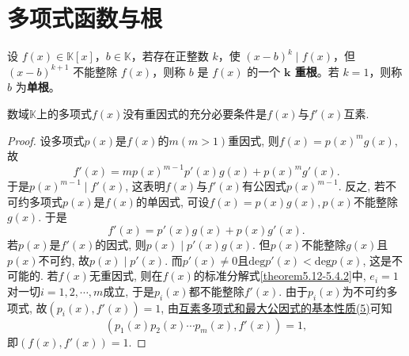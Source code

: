 \documentclass[../../main.tex]{subfiles}
\begin{document}
\section{多项式函数与根}

\begin{definition}[多项式的重根]\label{definition:多项式的重根}
设 $f(x) \in \mathbb{K}[x]$，$b \in \mathbb{K}$，若存在正整数 $k$，使 $(x - b)^k \mid f(x)$，但 $(x - b)^{k+1}$ 不能整除 $f(x)$，则称 $b$ 是 $f(x)$ 的一个 \textbf{$\boldsymbol{k}$ 重根}。若 $k = 1$，则称 $b$ 为\textbf{单根}。
\end{definition}

\begin{theorem}[多项式没有重因式的充要条件]\label{theorem:多项式没有重因式的充要条件}
数域\(\mathbb{K}\)上的多项式\(f(x)\)没有重因式的充分必要条件是\(f(x)\)与\(f'(x)\)互素.
\end{theorem}
\begin{proof}
设多项式\(p(x)\)是\(f(x)\)的\(m(m > 1)\)重因式, 则\(f(x)=p(x)^mg(x)\), 故
\[
f'(x)=mp(x)^{m - 1}p'(x)g(x)+p(x)^mg'(x).
\]
于是\(p(x)^{m - 1}\mid f'(x)\), 这表明\(f(x)\)与\(f'(x)\)有公因式\(p(x)^{m - 1}\).
反之, 若不可约多项式\(p(x)\)是\(f(x)\)的单因式, 可设\(f(x)=p(x)g(x), p(x)\)不能整除\(g(x)\). 于是
\[
f'(x)=p'(x)g(x)+p(x)g'(x).
\]
若\(p(x)\)是\(f'(x)\)的因式, 则\(p(x)\mid p'(x)g(x)\). 但\(p(x)\)不能整除\(g(x)\)且\(p(x)\)不可约, 故\(p(x)\mid p'(x)\). 而\(p'(x)\neq 0\)且\(\mathrm{deg }p'(x)<\mathrm{deg }p(x)\), 这是不可能的. 若\(f(x)\)无重因式, 则在\(f(x)\)的标准分解式\eqref{theorem5.12-5.4.2}中, \(e_i = 1\)对一切\(i = 1,2,\cdots,m\)成立, 于是\(p_i(x)\)都不能整除\(f'(x)\). 由于\(p_i(x)\)为不可约多项式, 故\((p_i(x),f'(x)) = 1\), 由\hyperref[proposition:互素多项式和最大公因式的基本性质]{互素多项式和最大公因式的基本性质(5)}可知
\[
(p_1(x)p_2(x)\cdots p_m(x),f'(x)) = 1,
\]
即\((f(x),f'(x)) = 1\).
\end{proof}
\end{document}
